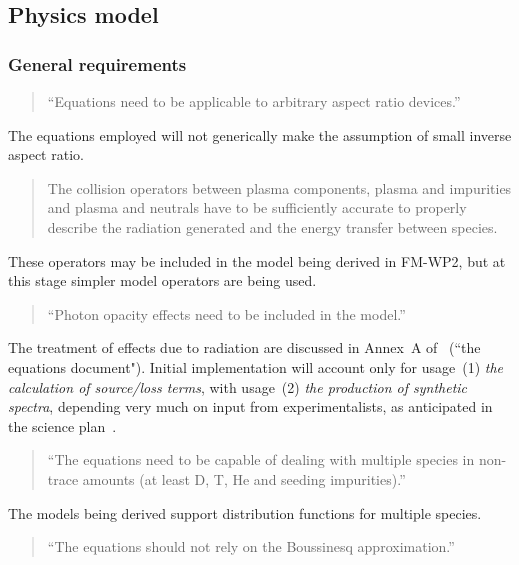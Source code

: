 \subsection{Physics model}
\label{sec:physics_model}

\subsubsection{General requirements}

\begin{quote}
``Equations need to be applicable to arbitrary aspect ratio devices.''
\end{quote}

The equations employed will not generically make the assumption of small
inverse aspect ratio.

\begin{quote}
The collision operators between plasma components, plasma and
impurities and plasma and neutrals have to be sufficiently accurate to properly
describe the radiation generated and the energy transfer between species.
\end{quote}

These operators may be included in the model being
derived in FM-WP2, but at this stage simpler model operators are being used.

\begin{quote}
``Photon opacity effects need to be included in the model.''
\end{quote}

The treatment of effects due to radiation are discussed in Annex~A of~\cite{pappeqs2}
(``the equations document"). Initial implementation will account only for
usage~(1) \emph{the calculation of source/loss terms}, with usage~(2) \emph{the production
of synthetic spectra}, depending very much on input from experimentalists,
as anticipated in the science plan~\cite[p\.\,11]{sciplan}.

\begin{quote}
``The equations need to be capable of dealing with multiple species in
non-trace amounts (at least D, T, He and seeding impurities).''
\end{quote}

The models being derived support distribution functions for multiple species.

\begin{quote}
``The equations should not rely on the Boussinesq approximation.''
\end{quote}

